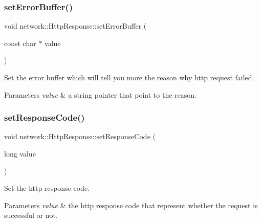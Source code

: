 \subsubsection{\texorpdfstring{set\+Error\+Buffer()}{setErrorBuffer()}\hspace{0.1cm}{\footnotesize\ttfamily [2/2]}}
{\footnotesize\ttfamily void network\+::\+Http\+Response\+::set\+Error\+Buffer (\begin{DoxyParamCaption}\item[{const char $\ast$}]{value }\end{DoxyParamCaption})\hspace{0.3cm}{\ttfamily [inline]}}

Set the error buffer which will tell you more the reason why http request failed. 
\begin{DoxyParams}{Parameters}
{\em value} & a string pointer that point to the reason. \\
\hline
\end{DoxyParams}
\mbox{\label{classnetwork_1_1HttpResponse_a97dff55588b04d216edeaac03c8bf159}} 
\subsubsection{\texorpdfstring{set\+Response\+Code()}{setResponseCode()}\hspace{0.1cm}{\footnotesize\ttfamily [1/2]}}
{\footnotesize\ttfamily void network\+::\+Http\+Response\+::set\+Response\+Code (\begin{DoxyParamCaption}\item[{long}]{value }\end{DoxyParamCaption})\hspace{0.3cm}{\ttfamily [inline]}}

Set the http response code. 
\begin{DoxyParams}{Parameters}
{\em value} & the http response code that represent whether the request is successful or not. \\
\hline
\end{DoxyParams}
\mbox{\label{classnetwork_1_1HttpResponse_a97dff55588b04d216edeaac03c8bf159}} 
